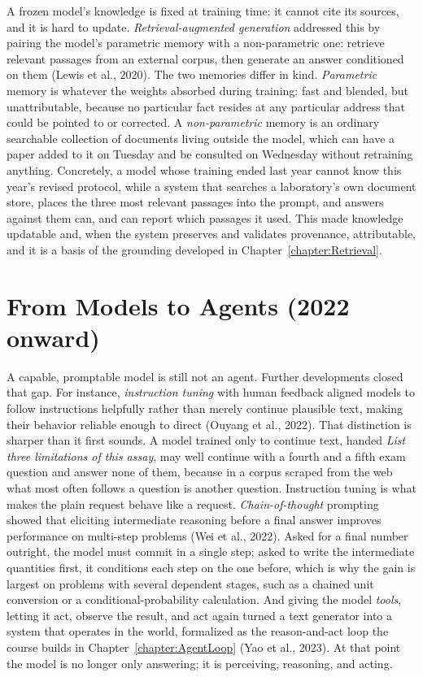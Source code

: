 A frozen model's knowledge is fixed at training time: it cannot cite its sources, and it is hard to update.
\emph{Retrieval-augmented generation} addressed this by pairing the model's parametric memory with a non-parametric one: retrieve relevant passages from an external corpus, then generate an answer conditioned on them (Lewis et al., 2020).
The two memories differ in kind.
\emph{Parametric} memory is whatever the weights absorbed during training: fast and blended, but unattributable, because no particular fact resides at any particular address that could be pointed to or corrected.
A \emph{non-parametric} memory is an ordinary searchable collection of documents living outside the model, which can have a paper added to it on Tuesday and be consulted on Wednesday without retraining anything.
Concretely, a model whose training ended last year cannot know this year's revised protocol, while a system that searches a laboratory's own document store, places the three most relevant passages into the prompt, and answers against them can, and can report which passages it used.
This made knowledge updatable and, when the system preserves and validates provenance, attributable, and it is a basis of the grounding developed in Chapter~\ref{chapter:Retrieval}.

\section{From Models to Agents (2022 onward)}
\label{section:FromModelsToAgents}

A capable, promptable model is still not an agent.
Further developments closed that gap.
For instance, \emph{instruction tuning} with human feedback aligned models to follow instructions helpfully rather than merely continue plausible text, making their behavior reliable enough to direct (Ouyang et al., 2022).
That distinction is sharper than it first sounds.
A model trained only to continue text, handed \emph{List three limitations of this assay}, may well continue with a fourth and a fifth exam question and answer none of them, because in a corpus scraped from the web what most often follows a question is another question.
Instruction tuning is what makes the plain request behave like a request.
\emph{Chain-of-thought} prompting showed that eliciting intermediate reasoning before a final answer improves performance on multi-step problems (Wei et al., 2022).
Asked for a final number outright, the model must commit in a single step; asked to write the intermediate quantities first, it conditions each step on the one before, which is why the gain is largest on problems with several dependent stages, such as a chained unit conversion or a conditional-probability calculation.
And giving the model \emph{tools}, letting it act, observe the result, and act again turned a text generator into a system that operates in the world, formalized as the reason-and-act loop the course builds in Chapter~\ref{chapter:AgentLoop} (Yao et al., 2023).
At that point the model is no longer only answering; it is perceiving, reasoning, and acting.

